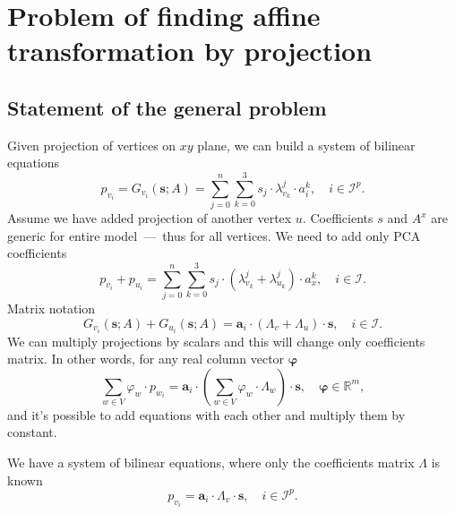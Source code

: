 \section{Problem of finding affine transformation by projection}

\subsection{Statement of the general problem}

Given projection of vertices on $xy$ plane,
we can build a system of bilinear equations
\begin{equation*}
  p_{v_i}
  = G_{v_i}\left( \pmb{s}; A \right)
  = \sum\limits_{j = 0}^{n} \sum\limits_{k = 0}^{3}
    s_{j} \cdot \lambda^{j}_{v_k} \cdot a_i^{k},
  \quad i \in \mathcal{I}^p.
\end{equation*}
Assume we have added projection of another vertex $u$.
Coefficients $s$ and $A^x$ are generic
for entire model~---~thus for all vertices.
We need to add only PCA coefficients
\begin{equation*}
  p_{v_i} + p_{u_i}
  = \sum\limits_{j = 0}^{n} \sum\limits_{k = 0}^{3}
    s_{j} \cdot \left( \lambda^{j}_{v_k} + \lambda^{j}_{u_k} \right)
    \cdot a_x^{k},
  \quad i \in \mathcal{I}.
\end{equation*}
Matrix notation
\begin{equation*}
  G_{v_i}\left( \pmb{s}; A \right) + G_{u_i}\left( \pmb{s}; A \right)
  = \pmb{a}_i \cdot \left( \Lambda_v + \Lambda_u \right) \cdot \pmb{s},
  \quad i \in \mathcal{I}.
\end{equation*}
We can multiply projections by scalars
and this will change only coefficients matrix.
In other words, for any real column vector $\pmb{\varphi}$
\begin{equation*}
  \sum_{w \in V} \varphi_w \cdot p_{w_i}
  = \pmb{a}_i
    \cdot \left( \sum_{w \in V} \varphi_w \cdot \Lambda_w \right)
    \cdot \pmb{s},
  \quad \pmb{\varphi} \in \mathbb{R}^m,
\end{equation*}
and it's possible to add equations with each other
and multiply them by constant.

We have a system of bilinear equations,
where only the coefficients matrix $\Lambda$ is known
\begin{equation}\label{eq:bilinear:matrix}
  p_{v_i}
  = \pmb{a}_i \cdot \Lambda_v \cdot \pmb{s},
  \quad i \in \mathcal{I}^p.
\end{equation}

